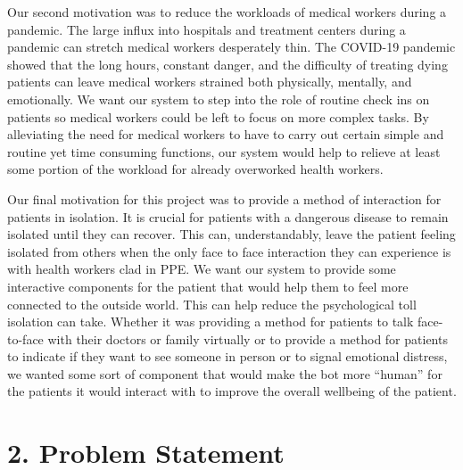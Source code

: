 ﻿\documentclass[10pt]{article}
\begin{document}
Our second motivation was to reduce the workloads of medical workers during a pandemic. The large influx into hospitals and treatment centers during a pandemic can stretch medical workers desperately thin. The COVID-19 pandemic showed that the long hours, constant danger, and the difficulty of treating dying patients can leave medical workers strained both physically, mentally, and emotionally. We want our system to step into the role of routine check ins on patients so medical workers could be left to focus on more complex tasks. By alleviating the need for medical workers to have to carry out certain simple and routine yet time consuming functions, our system would help to relieve at least some portion of the workload for already overworked health workers.
 
Our final motivation for this project was to provide a method of interaction for patients in isolation.  It is crucial for patients with a dangerous disease to remain isolated until they can recover. This can, understandably, leave the patient feeling isolated from others when the only face to face interaction they can experience is with health workers clad in PPE. We want our system to provide some interactive components for the patient that would help them to feel more connected to the outside world. This can help reduce the psychological toll isolation can take. Whether it was providing a method for patients to talk face-to-face with their doctors or family virtually or to provide a method for patients to indicate if they want to see someone in person or to signal emotional distress, we wanted some sort of component that would make the bot more “human” for the patients it would interact with to improve the overall wellbeing of the patient. 

\section{2. Problem Statement}
\end{document}
